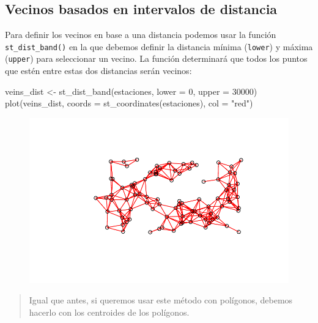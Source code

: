 \documentclass[
  letterpaper,
  DIV=11,
  numbers=noendperiod]{scrreprt}
\newenvironment{Shaded}{\begin{snugshade}}{\end{snugshade}}
\newcommand{\AttributeTok}[1]{\textcolor[rgb]{0.40,0.45,0.13}{#1}}
\newcommand{\DecValTok}[1]{\textcolor[rgb]{0.68,0.00,0.00}{#1}}
\newcommand{\FunctionTok}[1]{\textcolor[rgb]{0.28,0.35,0.67}{#1}}
\newcommand{\NormalTok}[1]{\textcolor[rgb]{0.00,0.23,0.31}{#1}}
\newcommand{\OtherTok}[1]{\textcolor[rgb]{0.00,0.23,0.31}{#1}}
\newcommand{\StringTok}[1]{\textcolor[rgb]{0.13,0.47,0.30}{#1}}
\begin{document}
\hypertarget{vecinos-basados-en-intervalos-de-distancia}{%
\subsection{Vecinos basados en intervalos de
distancia}\label{vecinos-basados-en-intervalos-de-distancia}}

Para definir los vecinos en base a una distancia podemos usar la función
\texttt{st\_dist\_band()} en la que debemos definir la distancia mínima
(\texttt{lower}) y máxima (\texttt{upper}) para seleccionar un vecino.
La función determinará que todos los puntos que estén entre estas dos
distancias serán vecinos:

\begin{Shaded}
\begin{Highlighting}[]
\NormalTok{veins\_dist }\OtherTok{\textless{}{-}} \FunctionTok{st\_dist\_band}\NormalTok{(estaciones, }\AttributeTok{lower =} \DecValTok{0}\NormalTok{, }\AttributeTok{upper =} \DecValTok{30000}\NormalTok{)}
\FunctionTok{plot}\NormalTok{(veins\_dist, }\AttributeTok{coords =} \FunctionTok{st\_coordinates}\NormalTok{(estaciones), }\AttributeTok{col =} \StringTok{"red"}\NormalTok{)}
\end{Highlighting}
\end{Shaded}

\begin{figure}[H]

{\centering \includegraphics{04_AutocorrelacionEspacial_files/figure-pdf/unnamed-chunk-7-1.pdf}

}

\end{figure}

\begin{quote}
Igual que antes, si queremos usar este método con polígonos, debemos
hacerlo con los centroides de los polígonos.
\end{quote}
\end{document}
